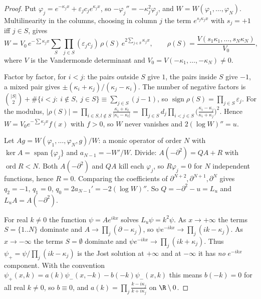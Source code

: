 \begin{proof}
Put $\varphi_j=e^{-\kappa_jx}+\varepsilon_jc_je^{\kappa_jx}$, so $-\varphi_j''=-\kappa_j^2\varphi_j$, and $W=W(\varphi_1,\dots,\varphi_N)$. Multilinearity in the columns, choosing in column $j$ the term $e^{s_j\kappa_jx}$ with $s_j=+1$ iff $j\in S$, gives
\[
W=V_0\,e^{-\sum\kappa_jx}\sum_S\prod_{j\in S}(\varepsilon_jc_j)\,\rho(S)\,e^{2\sum_{j\in S}\kappa_jx},\qquad \rho(S)=\frac{V(s_1\kappa_1,\dots,s_N\kappa_N)}{V_0},
\]
where $V$ is the Vandermonde determinant and $V_0=V(-\kappa_1,\dots,-\kappa_N)\ne0$.

Factor by factor, for $i<j$: the pairs outside $S$ give $1$, the pairs inside $S$ give $-1$, a mixed pair gives $\pm(\kappa_i+\kappa_j)/(\kappa_j-\kappa_i)$. The number of negative factors is $\binom{|S|}2+\#\{i<j:\ i\notin S,\ j\in S\}\equiv\sum_{j\in S}(j-1)$, so $\operatorname{sign}\rho(S)=\prod_{j\in S}\varepsilon_j$. For the modulus, $|\rho(S)|=\prod_{i\in S,l\notin S}\frac{\kappa_i+\kappa_l}{|\kappa_i-\kappa_l|}=\prod_{j\in S}d_j\prod_{i<j\in S}\bigl(\tfrac{\kappa_i-\kappa_j}{\kappa_i+\kappa_j}\bigr)^2$. Hence $W=V_0e^{-\sum\kappa_jx}f(x)$ with $f>0$, so $W$ never vanishes and $2(\log W)''=u$.

Let $Ag=W(\varphi_1,\dots,\varphi_N,g)/W$: a monic operator of order $N$ with $\ker A=\operatorname{span}\{\varphi_j\}$ and $a_{N-1}=-W'/W$. Divide: $A(-\partial^2)=QA+R$ with $\operatorname{ord}R<N$. Both $A(-\partial^2)$ and $QA$ kill each $\varphi_j$, so $R\varphi_j=0$ for $N$ independent functions, hence $R=0$. Comparing the coefficients of $\partial^{N+2},\partial^{N+1},\partial^N$ gives $q_2=-1$, $q_1=0$, $q_0=2a_{N-1}'=-2(\log W)''$. So $Q=-\partial^2-u=L_u$ and $L_uA=A(-\partial^2)$.

For real $k\ne0$ the function $\psi=Ae^{ikx}$ solves $L_u\psi=k^2\psi$. As $x\to+\infty$ the terms $S=\{1..N\}$ dominate and $A\to\prod_j(\partial-\kappa_j)$, so $\psi e^{-ikx}\to\prod_j(ik-\kappa_j)$. As $x\to-\infty$ the terms $S=\emptyset$ dominate and $\psi e^{-ikx}\to\prod_j(ik+\kappa_j)$. Thus $\psi_+=\psi/\prod_j(ik-\kappa_j)$ is the Jost solution at $+\infty$ and at $-\infty$ it has \emph{no} $e^{-ikx}$ component. With the convention $\psi_+(x,k)=a(k)\psi_-(x,-k)-b(-k)\psi_-(x,k)$ this means $b(-k)=0$ for all real $k\ne0$, so $b\equiv0$, and $a(k)=\prod_j\frac{k-i\kappa_j}{k+i\kappa_j}$ on $\R\setminus0$.


\end{proof}
